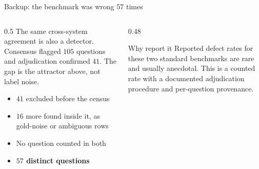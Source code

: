 \begin{frame}{Backup: the benchmark was wrong $57$ times}
  \begin{columns}[T]
    \begin{column}{0.5\textwidth}
      \small
      \agrraggedright The same cross-system agreement is also a
      \alert{detector}. Consensus flagged $105$ questions and adjudication
      confirmed $41$. The gap is the attractor above, not label noise.
      \begin{itemize}
        \item $41$ excluded before the census
        \item $16$ more found inside it, as gold-noise or ambiguous rows
        \item No question counted in both
        \item[$\Rightarrow$] \textbf{$57$ distinct questions}
      \end{itemize}
    \end{column}
    \begin{column}{0.48\textwidth}
      \begin{block}{Why report it}
        \small\agrraggedright
        Reported defect rates for these two standard benchmarks are rare and
        usually anecdotal. This is a counted rate with a documented
        adjudication procedure and per-question provenance.
      \end{block}
    \end{column}
  \end{columns}
\end{frame}

